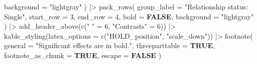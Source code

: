 \documentclass[
  bookmarksnumbered]{article}
\newenvironment{Shaded}{\begin{snugshade}}{\end{snugshade}}
\newcommand{\AttributeTok}[1]{\textcolor[rgb]{0.80,0.80,0.80}{#1}}
\newcommand{\ConstantTok}[1]{\textcolor[rgb]{0.86,0.64,0.64}{\textbf{#1}}}
\newcommand{\DecValTok}[1]{\textcolor[rgb]{0.86,0.86,0.80}{#1}}
\newcommand{\FunctionTok}[1]{\textcolor[rgb]{0.94,0.94,0.56}{#1}}
\newcommand{\NormalTok}[1]{\textcolor[rgb]{0.80,0.80,0.80}{#1}}
\newcommand{\OtherTok}[1]{\textcolor[rgb]{0.94,0.94,0.56}{#1}}
\newcommand{\SpecialCharTok}[1]{\textcolor[rgb]{0.86,0.64,0.64}{#1}}
\newcommand{\StringTok}[1]{\textcolor[rgb]{0.80,0.58,0.58}{#1}}
\begin{document}
\begin{Shaded}
\begin{Highlighting}[]
    \AttributeTok{background =} \StringTok{"lightgray"}
\NormalTok{  ) }\SpecialCharTok{|\textgreater{}}
  \FunctionTok{pack\_rows}\NormalTok{(}
    \AttributeTok{group\_label =} \StringTok{"Relationship status: Single"}\NormalTok{,}
    \AttributeTok{start\_row =} \DecValTok{3}\NormalTok{,}
    \AttributeTok{end\_row =} \DecValTok{4}\NormalTok{,}
    \AttributeTok{bold =} \ConstantTok{FALSE}\NormalTok{,}
    \AttributeTok{background =} \StringTok{"lightgray"}
\NormalTok{  ) }\SpecialCharTok{|\textgreater{}}
  \FunctionTok{add\_header\_above}\NormalTok{(}\FunctionTok{c}\NormalTok{(}\StringTok{" "} \OtherTok{=} \DecValTok{6}\NormalTok{, }\StringTok{"Contrasts"} \OtherTok{=} \DecValTok{6}\NormalTok{)) }\SpecialCharTok{|\textgreater{}}
  \FunctionTok{kable\_styling}\NormalTok{(}\AttributeTok{latex\_options =} \FunctionTok{c}\NormalTok{(}\StringTok{"HOLD\_position"}\NormalTok{, }\StringTok{"scale\_down"}\NormalTok{)) }\SpecialCharTok{|\textgreater{}}
  \FunctionTok{footnote}\NormalTok{(}
    \AttributeTok{general =} \StringTok{"Significant effects are in bold."}\NormalTok{,}
    \AttributeTok{threeparttable =} \ConstantTok{TRUE}\NormalTok{,}
    \AttributeTok{footnote\_as\_chunk =} \ConstantTok{TRUE}\NormalTok{,}
    \AttributeTok{escape =} \ConstantTok{FALSE}
\NormalTok{  )}
\end{Highlighting}
\end{Shaded}
\end{document}
